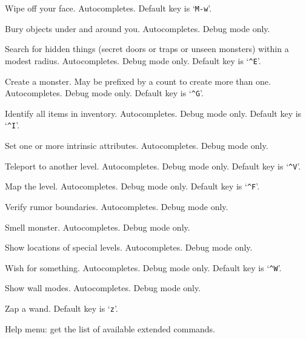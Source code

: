 Wipe off your face. Autocompletes. Default key is `{\tt M-w}'.
\item[\tb{\#wizbury}]
Bury objects under and around you.
Autocompletes.
Debug mode only.
\item[\tb{\#wizdetect}]
Search for hidden things (secret doors or traps or unseen monsters)
within a modest radius.
Autocompletes.
Debug mode only.
Default key is `{\tt \^{}E}'.
\item[\tb{\#wizgenesis}]
Create a monster.
May be prefixed by a count to create more than one.
Autocompletes.
Debug mode only.
Default key is `{\tt \^{}G}'.
\item[\tb{\#wizidentify}]
Identify all items in inventory.
Autocompletes.
Debug mode only.
Default key is `{\tt \^{}I}'.
\item[\tb{\#wizintrinsic}]
Set one or more intrinsic attributes.
Autocompletes.
Debug mode only.
\item[\tb{\#wizlevelport}]
Teleport to another level.
Autocompletes.
Debug mode only.
Default key is `{\tt \^{}V}'.
\item[\tb{\#wizmap}]
Map the level.
Autocompletes.
Debug mode only.
Default key is `{\tt \^{}F}'.
\item[\tb{\#wizrumorcheck}]
Verify rumor boundaries.
Autocompletes.
Debug mode only.
\item[\tb{\#wizsmell}]
Smell monster.
Autocompletes.
Debug mode only.
\item[\tb{\#wizwhere}]
Show locations of special levels.
Autocompletes.
Debug mode only.
\item[\tb{\#wizwish}]
Wish for something.
Autocompletes.
Debug mode only.
Default key is `{\tt \^{}W}'.
\item[\tb{\#wmode}]
Show wall modes.
Autocompletes.
Debug mode only.
\item[\tb{\#zap}]
Zap a wand. Default key is `{\tt z}'.
\item[\tb{\#?}]
Help menu:  get the list of available extended commands.
\elist

